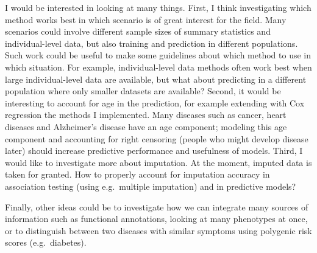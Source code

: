 I would be interested in looking at many things. 
First, I think investigating which method works best in which scenario is of great interest for the field. 
Many scenarios could involve different sample sizes of summary statistics and individual-level data, but also training and prediction in different populations.
Such work could be useful to make some guidelines about which method to use in which situation. For example, individual-level data methods often work best when large individual-level data are available, but what about predicting in a different population where only smaller datasets are available?
Second, it would be interesting to account for age in the prediction, for example extending with Cox regression the methods I implemented. Many diseases such as cancer, heart diseases and Alzheimer's disease have an age component; modeling this age component and accounting for right censoring (people who might develop disease later) should increase predictive performance and usefulness of models.
Third, I would like to investigate more about imputation. At the moment, imputed data is taken for granted. How to properly account for imputation accuracy in association testing (using e.g.\ multiple imputation) and in predictive models? 

Finally, other ideas could be to investigate how we can integrate many sources of information such as functional annotations, looking at many phenotypes at once, or to distinguish between two diseases with similar symptoms using polygenic risk scores (e.g.\ diabetes).
